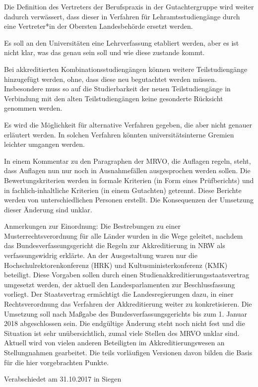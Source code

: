 \documentclass[DIV=calc]{scrartcl}
\begin{document}
\begin{compactitem}
\item Die Definition des Vertreters der Berufspraxis in der Gutachtergruppe wird weiter dadurch verwässert, dass dieser in Verfahren für Lehramtsstudiengänge durch eine Vertreter*in der Obersten Landesbehörde ersetzt werden.
\item Es soll an den Universitäten eine \glqq Lehrverfassung\grqq{} etabliert werden, aber es ist nicht klar, was das genau sein soll und wie diese zustande kommt.
\item Bei akkreditierten Kombinationsstudiengängen können weitere Teilstudiengänge hinzugefügt werden, ohne, dass diese neu begutachtet werden müssen. Insbesondere muss so auf die Studierbarkeit der neuen Teilstudiengänge in Verbindung mit den alten Teilstudiengängen keine gesonderte Rücksicht genommen werden.
\item Es wird die Möglichkeit für alternative Verfahren gegeben, die aber nicht genauer erläutert werden. In solchen Verfahren könnten universitätsinterne Gremien leichter umgangen werden.
\item In einem Kommentar zu den Paragraphen der MRVO, die Auflagen regeln, steht, dass Auflagen nun nur noch in Ausnahmefällen ausgesprochen werden sollen. Die Bewertungskriterien werden in formale Kriterien (in Form eines Prüfberichts) und in fachlich-inhaltliche Kriterien (in einem Gutachten) getrennt. Diese Berichte werden von unterschiedlichen Personen erstellt. Die Konsequenzen der Umsetzung dieser Änderung sind unklar.
\end{compactitem}

Anmerkungen zur Einordnung:
Die Bestrebungen zu einer Musterrechtsverordnung für alle Länder wurden in die Wege geleitet, nachdem das Bundesverfassungsgericht die Regeln zur Akkreditierung in NRW als verfassungswidrig erklärte. An der Ausgestaltung waren nur die Hochschulrektorenkonferenz (HRK) und Kultusministerkonferenz (KMK) beteiligt.
Diese Vorgaben sollen durch einen Studienakkreditierungsstaatsvertrag umgesetzt werden, der aktuell den Landesparlamenten zur Beschlussfassung vorliegt. Der Staatsvertrag ermächtigt die Landesregierungen dazu, in einer Rechtsverordnung das Verfahren der Akkreditierung weiter zu konkretisieren. Die Umsetzung soll nach Maßgabe des Bundesverfassungsgerichts bis zum 1. Januar 2018 abgeschlossen sein. Die endgültige Änderung steht noch nicht fest und die Situation ist sehr unübersichtlich, zumal viele Stellen des MRVO unklar sind.
Aktuell wird von vielen anderen Beteiligten im Akkreditierungswesen an Stellungnahmen gearbeitet. Die teils vorläufigen Versionen davon bilden die Basis für die hier vorgebrachten Punkte.

\vspace{-0.5\baselineskip}
    \begin{flushright}
        Verabschiedet am 31.10.2017 in Siegen
    \end{flushright}
\end{document}
